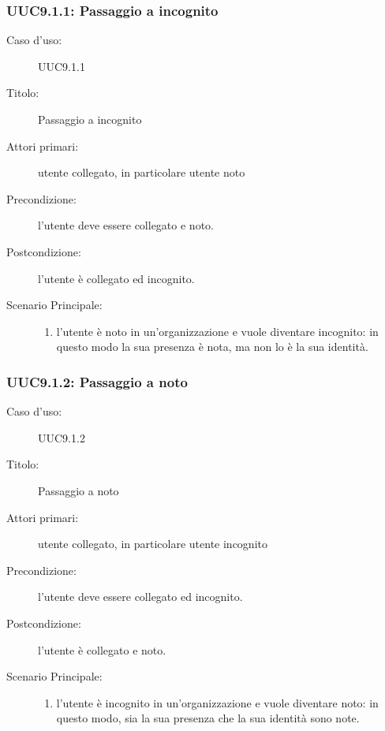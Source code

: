 \documentclass[../../../analisi-dei-requisiti.tex]{subfiles}
\begin{document}
\subsubsection{UUC9.1.1: Passaggio a incognito}%
\label{subs:UUC9.1.1}
\begin{description}
  \item[Caso d’uso:] UUC9.1.1
  \item[Titolo:] Passaggio a incognito
  \item[Attori primari:] utente collegato, in particolare utente noto
  \item[Precondizione:] l'utente deve essere collegato e noto.
  \item[Postcondizione:] l'utente è collegato ed incognito.
  \item[Scenario Principale:]
        \begin{enumerate}
          \item l'utente è noto in un'organizzazione e vuole diventare incognito: in questo modo la sua presenza è nota, ma non lo è la sua identità.
        \end{enumerate}
\end{description}

\subsubsection{UUC9.1.2: Passaggio a noto}%
\label{subs:UUC9.1.2}
\begin{description}
  \item[Caso d’uso:] UUC9.1.2
  \item[Titolo:] Passaggio a noto
  \item[Attori primari:] utente collegato, in particolare utente incognito
  \item[Precondizione:] l'utente deve essere collegato ed incognito.
  \item[Postcondizione:] l'utente è collegato e noto.
  \item[Scenario Principale:]
        \begin{enumerate}
          \item l'utente è incognito in un'organizzazione e vuole diventare noto: in questo modo, sia la sua presenza che la sua identità sono note.
        \end{enumerate}
\end{description}
\end{document}
